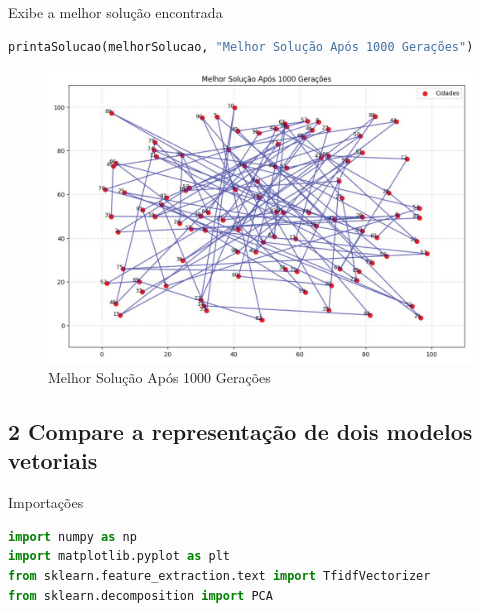 Exibe a melhor solução encontrada

\begin{lstlisting}[language=Python, style=input]
printaSolucao(melhorSolucao, "Melhor Solução Após 1000 Gerações")
\end{lstlisting}

\begin{figure}[H]
\centering
\includegraphics[width=1\linewidth]{apendices/fig/IAA015_2.png}
\caption{Melhor Solução Após 1000 Gerações}
\end{figure}

\subsection{2 Compare a representação de dois modelos vetoriais}

Importações

\begin{lstlisting}[language=Python, style=input]
import numpy as np
import matplotlib.pyplot as plt
from sklearn.feature_extraction.text import TfidfVectorizer
from sklearn.decomposition import PCA
\end{lstlisting}

